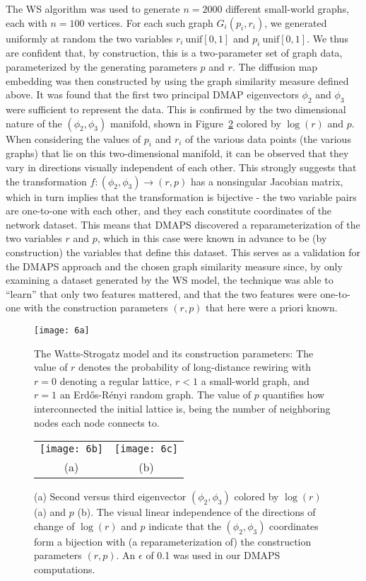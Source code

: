 The WS algorithm was used to generate $n=2000$ different small-world
graphs, each with $n=100$ vertices. For each such graph
$G_i(p_i, r_i)$, we generated uniformly at random the two variables
$r_i ~ \mathrm{unif}[0,1]$ and $p_i ~ \mathrm{unif}[0,1]$. We thus are
confident that, by construction, this is a two-parameter set of graph
data, parameterized by the generating parameters $p$ and $r$. The
diffusion map embedding was then constructed by using the graph
similarity measure defined above. It was found that the first two
principal DMAP eigenvectors $\phi_2$ and $\phi_3$ were sufficient to
represent the data. This is confirmed by the two dimensional nature of
the $(\phi_2, \phi_3)$ manifold, shown in Figure~\ref{fig:sis6bc}
colored by $\log(r)$ and $p$. When considering the values of $p_i$ and
$r_i$ of the various data points (the various graphs) that lie on this
two-dimensional manifold, it can be observed that they vary in
directions visually independent of each other. This strongly suggests
that the transformation $f:(\phi_2, \phi_3) \rightarrow (r,p)$ has a
nonsingular Jacobian matrix, which in turn implies that the
transformation is bijective - the two variable pairs are one-to-one
with each other, and they each constitute coordinates of the network
dataset. This means that DMAPS discovered a reparameterization of the
two variables $r$ and $p$, which in this case were known in advance to
be (by construction) the variables that define this dataset. This
serves as a validation for the DMAPS approach and the chosen graph
similarity measure since, by only examining a dataset generated by the
WS model, the technique was able to “learn” that only two features
mattered, and that the two features were one-to-one with the
construction parameters $(r, p)$ that here were a priori known.


\begin{figure}[!htp]
\centering
\texttt{[image: 6a]}
\caption[Variations of Watts-Strogatz model]{The Watts-Strogatz model and its construction parameters:
  The value of $r$ denotes the probability of long-distance rewiring
  with $r = 0$ denoting a regular lattice, $r < 1$ a small-world graph,
  and $r = 1$ an Erd\H{o}s-R\'{e}nyi random graph. The value of $p$ quantifies how
  interconnected the initial lattice is, being the number of
  neighboring nodes each node connects to. \label{fig:sis6a}}
\end{figure}

\begin{figure}[!htp]
\centering
\begin{tabular}{cc}
  \texttt{[image: 6b]} &
  \texttt{[image: 6c]}\\
  (a) & (b)
\end{tabular}
\caption[DMAPS results on Watts-Strogatz networks]{(a) Second versus third eigenvector $(\phi_2 ,\phi_3)$
  colored by $\log(r)$ (a) and $p$ (b). The visual linear independence
  of the directions of change of $\log(r)$ and $p$ indicate that the
  $(\phi_2 ,\phi_3)$ coordinates form a bijection with (a
  reparameterization of) the construction parameters $(r, p)$. An
  $\epsilon$ of 0.1 was used in our DMAPS
  computations. \label{fig:sis6bc}}
\end{figure}


